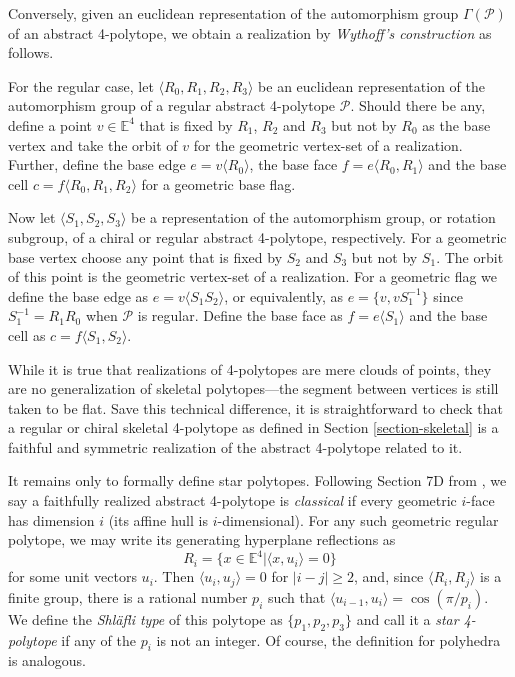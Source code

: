Conversely, given an euclidean representation
of the automorphism group
$\Gamma(\mathcal{P})$ of an abstract
4-polytope, we obtain a realization by
\textit{Wythoff's construction} as follows.

For the regular case, let $\langle R_0,
R_1,R_2,R_3\rangle$ be an euclidean
representation of the automorphism group of a
regular abstract 4-polytope $\mathcal{P}$.
Should there be any, define a point
$v\in\mathbb{E}^4$ that is fixed by $R_1$,
$R_2$ and $R_3$ but not by $R_0$ as the base
vertex and take the orbit of $v$ for the
geometric vertex-set of a realization.
Further, define the base edge $e=v\langle
R_0\rangle$, the base face $f=e\langle
R_0,R_1\rangle$ and the base cell $c=f\langle
R_0,R_1,R_2\rangle$ for a geometric base
flag.

Now let $\langle S_1,S_2,S_3\rangle$ be a
representation of the automorphism group, or
rotation subgroup, of a chiral or regular
abstract 4-polytope, respectively. For a
geometric base vertex choose any point that
is fixed by $S_2$ and $S_3$ but not by $S_1$.
The orbit of this point is the geometric
vertex-set of a realization. For a geometric
flag we define the base edge as $e=v\langle
S_1S_2\rangle$, or equivalently, as
$e=\{v,vS_1^{-1}\}$ since $S_1^{-1}=R_1R_0$
when $\mathcal{P}$ is regular. Define the
base face as $f=e\langle S_1\rangle$ and the
base cell as $c=f\langle S_1,S_2\rangle$.

While it is true that realizations of
4-polytopes are mere clouds of points, they
are no generalization of skeletal
polytopes---the segment between vertices is
still taken to be flat. Save this technical
difference, it is straightforward to check
that a regular or chiral skeletal 4-polytope
as defined in Section \ref{section-skeletal}
is a faithful and symmetric realization of
the abstract 4-polytope related to it.

\medskip\noindent
It remains only to formally define star
polytopes. Following Section 7D from
\cite{abstract-polytopes}, we say a
faithfully realized abstract 4-polytope is
\textit{classical} if every geometric
$i$-face has dimension $i$ (its affine hull
is $i$-dimensional). For any such geometric
regular polytope, we may write its generating
hyperplane reflections as
$$
R_i=\{x\in\mathbb{E}^4|
\langle x,u_i\rangle=0\}
$$
for some unit vectors $u_i$. Then $\langle
u_i,u_j\rangle=0$ for $|i-j|\geq2$, and,
since $\langle R_i,R_j\rangle$ is a finite
group, there is a rational number $p_i$ such
that $\langle
u_{i-1},u_i\rangle=\cos(\pi/p_i)$. We define
the \textit{Shläfli type} of this polytope as
$\{p_1,p_2,p_3\}$ and call it a \textit{star
4-polytope} if any of the $p_i$ is not an
integer. Of course, the definition for
polyhedra is analogous.





